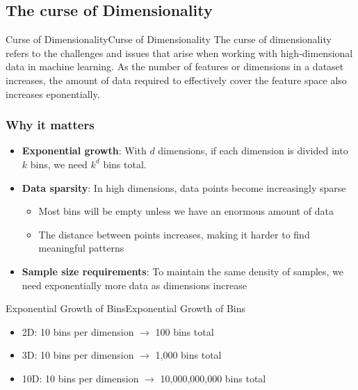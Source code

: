 \documentclass[a4paper]{article}
\theoremstyle{definition}
\begin{document}
\subsection{The curse of Dimensionality}
\begin{definition}{Curse of Dimensionality}{Curse of Dimensionality}
The curse of dimensionality refers to the challenges and issues that arise when working with high-dimensional data in machine learning.
\vspace{1em}
\noindent
\newline
As the number of features or dimensions in a dataset increases, the amount of data required to effectively cover the feature space also 
increases eponentially.
\end{definition}
\subsubsection{Why it matters}
\begin{itemize}
    \item \textbf{Exponential growth}: With \( d \) dimensions, if each dimension is divided into \( k \) bins, we need \( k^d \) bins total.
    \item \textbf{Data sparsity}: In high dimensions, data points become increasingly sparse
    \begin{itemize}
        \item Most bins will be empty unless we have an enormous amount of data 
        \item The distance between points increases, making it harder to find meaningful patterns
    \end{itemize}
    \item \textbf{Sample size requirements}: To maintain the same density of samples, we need exponentially more data as dimensions increase
\end{itemize}
\begin{example}{Exponential Growth of Bins}{Exponential Growth of Bins}
\begin{itemize}
    \item 2D: 10 bins per dimension \( \rightarrow \) 100 bins total 
    \item 3D: 10 bins per dimension \( \rightarrow \) 1,000 bins total 
    \item 10D: 10 bins per dimension \( \rightarrow \) 10,000,000,000 bins total
\end{itemize}
\end{example}
\end{document}
